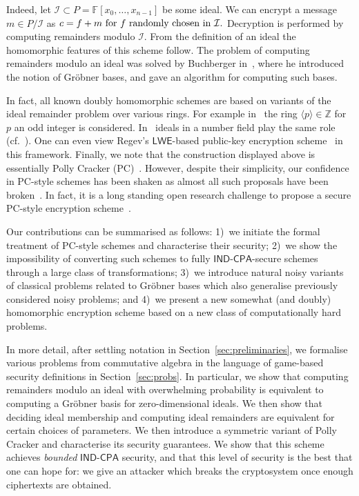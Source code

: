 \documentclass[draft]{llncs}
\newcommand{\heading}[1]{{\vspace{6pt}\noindent\sc{#1.}}}
\newcommand{\ring}[1]{\mathbb{#1}}
\newcommand{\F}{\ensuremath{\ring{F}}\xspace}
\newcommand{\FX}{\ensuremath{\F[x_0,\dots,x_{n-1}]}\xspace}
\newcommand{\ideal}[1]{\ensuremath{\langle #1 \rangle}\xspace}
\newcommand{\I}{\ensuremath{\mathcal{I}}\xspace}
\newcommand{\LWE}{\ensuremath{\mathsf{LWE}}\xspace}
\newcommand{\IND}{\mathsf{IND}}
\newcommand{\CPA}{\mathsf{CPA}}
\newcommand{\INDCPA}{\ensuremath{\IND\mbox{-}\CPA}\xspace}
\begin{document}
Indeed, let $\I \subset P = \FX$ be some ideal. We can encrypt a message $m \in P/\I$ as $c = f + m \textnormal{ for } f \mbox{ randomly chosen in } \I.$ Decryption is performed by computing remainders modulo $\I$. From the definition of an ideal the homomorphic features of this scheme follow. The problem of computing remainders modulo an ideal was solved by Buchberger in~\cite{Buchberger65}, where he introduced the notion of Gröbner bases, and gave an algorithm for computing such bases. 
 
In fact, all known doubly homomorphic schemes are based on variants of the ideal remainder problem over various rings. For example in~\cite{DGHV10} the ring $\ideal{p} \in \mathbb{Z}$ for $p$ an odd integer is considered. In~\cite{Gen09} ideals in a number field play the same role (cf.~\cite{SV10}). One can even view Regev's \LWE-based public-key encryption scheme~\cite{regev:lwe} in this framework. Finally, we note that the construction displayed above is essentially Polly Cracker (PC)~\cite{Fellows&Koblitz:1994}. However, despite their simplicity, our confidence in PC-style schemes has been shaken as almost all such proposals have been broken~\cite{LdVMPT09}. In fact, it is a long standing open research challenge to propose a secure PC-style encryption scheme~\cite{DBLP:journals/jsc/BarkeeCEMR94}.

\heading{Contributions \& Organisation}
Our contributions can be summarised as follows: 1)~we initiate the formal treatment of PC-style schemes and characterise their security; 2)~we show the impossibility of converting such sche\-mes to fully \INDCPA-secure schemes through a large class of transformations; 3)~we introduce natural noisy variants of classical problems related to Gröbner bases which also generalise previously considered noisy problems; and 4)~we present a new somewhat (and doubly) homomorphic encryption scheme based on a new class of computationally hard problems. 

In more detail, after settling notation in Section~\ref{sec:preliminaries}, we formalise various problems from commutative algebra in the language of game-based security definitions in Section~\ref{sec:probs}. In particular,
we show that computing remainders modulo an ideal with overwhelming probability is equivalent to computing a Gröbner basis for zero-dimensional ideals. We then show that deciding ideal membership and computing ideal remainders are equivalent for certain choices of parameters. We then introduce a symmetric variant of Polly Cracker and characterise its security guarantees. We show that this scheme achieves {\em bounded} \INDCPA security, and that this level of security is the best that one can hope for: we give an attacker which breaks the cryptosystem once enough ciphertexts are obtained. 
\end{document}
